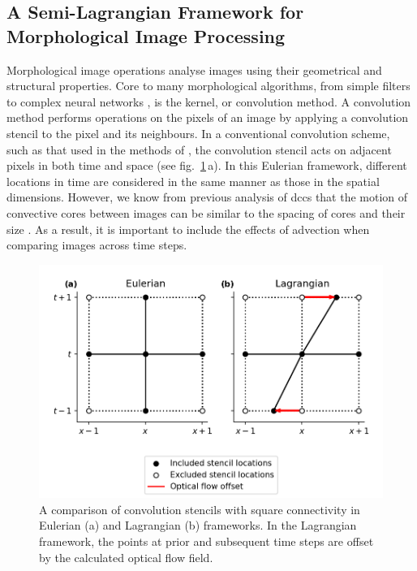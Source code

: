 \subsection{A Semi-Lagrangian Framework for Morphological Image Processing}

Morphological image operations analyse images using their geometrical and structural properties.
Core to many morphological algorithms, from simple filters to complex neural networks \citep{kalchbrenner_convolutional_2014}, is the kernel, or convolution method.
A convolution method performs operations on the pixels of an image by applying a convolution stencil to the pixel and its neighbours.
In a conventional convolution scheme, such as that used in the methods of \citet{fiolleau_algorithm_2013}, the convolution stencil acts on adjacent pixels in both time and space (see fig.~\ref{fig:convolution_kernels}\,a).
In this Eulerian framework, different locations in time are considered in the same manner as those in the spatial dimensions.
However, we know from previous analysis of \acrshort{dcc}s that the motion of convective cores between images can be similar to the spacing of cores and their size \citep{heikenfeld_tobac_2019}.
As a result, it is important to include the effects of advection when comparing images across time steps.


\begin{figure}[t]
    \includegraphics[width=\textwidth]{figures/chapter1_15.png}
    \caption[
    A comparison of convolution stencils with square connectivity in Eulerian and Lagrangian frameworks.
    ]{
    A comparison of convolution stencils with square connectivity in Eulerian (a) and Lagrangian (b) frameworks. In the Lagrangian framework, the points at prior and subsequent time steps are offset by the calculated optical flow field.
    }
    \label{fig:convolution_kernels}
\end{figure}


